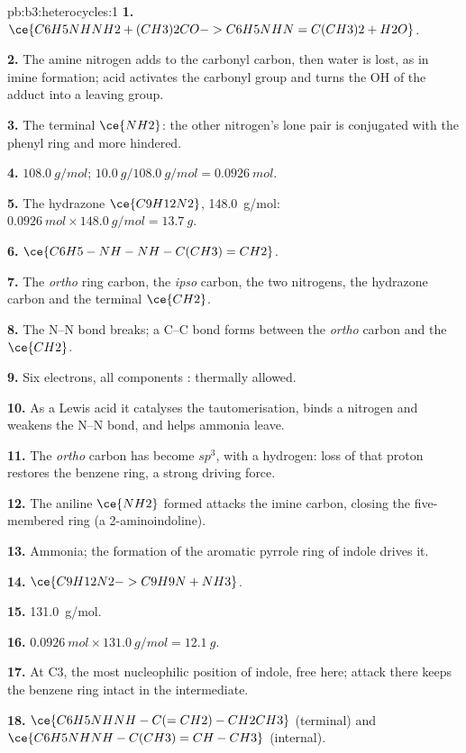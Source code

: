 \begin{solution}{pb:b3:heterocycles:1}
\textbf{1.} $\ce{C6H5NHNH2 + (CH3)2CO -> C6H5NHN=C(CH3)2 + H2O}$.

\textbf{2.} The amine nitrogen adds to the carbonyl carbon, then water is lost, as in
imine formation; acid activates the carbonyl group and turns the OH of the adduct
into a leaving group.

\textbf{3.} The terminal $\ce{NH2}$: the other nitrogen's lone pair is conjugated with the
phenyl ring and more hindered.

\textbf{4.} $\qty{108.0}{g/mol}$; $\qty{10.0}{g}/\qty{108.0}{g/mol} = \qty{0.0926}{mol}$.

\textbf{5.} The hydrazone $\ce{C9H12N2}$, \qty{148.0}{g/mol}: $\qty{0.0926}{mol} \times \qty{148.0}{g/mol} = \qty{13.7}{g}$.

\textbf{6.} $\ce{C6H5-NH-NH-C(CH3)=CH2}$.

\textbf{7.} The \textit{ortho} ring carbon, the \textit{ipso} carbon, the two nitrogens, the hydrazone carbon
and the terminal $\ce{CH2}$.

\textbf{8.} The N--N bond breaks; a C--C bond forms between the \textit{ortho} carbon and the $\ce{CH2}$.

\textbf{9.} Six electrons, all components : thermally allowed.

\textbf{10.} As a Lewis acid it catalyses the tautomerisation, binds a nitrogen and
weakens the N--N bond, and helps ammonia leave.

\textbf{11.} The \textit{ortho} carbon has become $sp^3$, with a hydrogen: loss of that proton
restores the benzene ring, a strong driving force.

\textbf{12.} The aniline $\ce{NH2}$ formed attacks the imine carbon, closing the
five-membered ring (a 2-aminoindoline).

\textbf{13.} Ammonia; the formation of the aromatic pyrrole ring of indole drives it.

\textbf{14.} $\ce{C9H12N2 -> C9H9N + NH3}$.

\textbf{15.} \qty{131.0}{g/mol}.

\textbf{16.} $\qty{0.0926}{mol} \times \qty{131.0}{g/mol} = \qty{12.1}{g}$.

\textbf{17.} At C3, the most nucleophilic position of indole, free here; attack there
keeps the benzene ring intact in the intermediate.

\textbf{18.} $\ce{C6H5NHNH-C(=CH2)-CH2CH3}$ (terminal) and $\ce{C6H5NHNH-C(CH3)=CH-CH3}$ (internal).


\end{solution}
